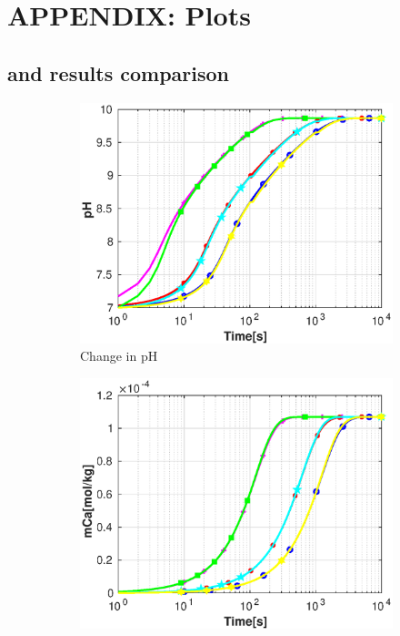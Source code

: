 \chapter{APPENDIX: Plots}\label{app:appendixB}
\thispagestyle{empty}
\section{\DuMuX and \MATLAB results comparison}

\begin{figure}
    \centering
    \begin{subfigure}{.5\linewidth}
            \centering
        \includegraphics[width=\textwidth]{PICTURES/dvm_pH7_pH.eps}
        \caption{Change in pH}
        \label{fig:dvmpH7pH}
    \end{subfigure}%
        \hfill
    \begin{subfigure}{.5\linewidth}
            \centering
        \includegraphics[width=\textwidth]{PICTURES/dvm_pH7_mCa.eps}

\end{subfigure}
\end{figure}
